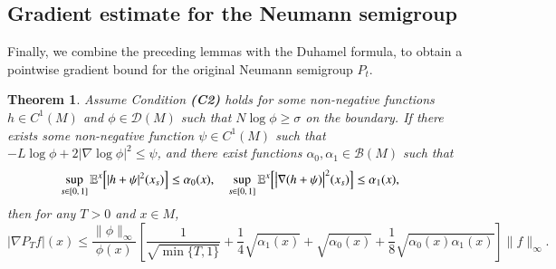 \documentclass[11pt,twoside, reqno]{article}
\def\r{\right}
\def\l{\left}
\newcommand\1{\mathbbm{1}}
\newtheorem{theorem}{Theorem}[section]
\theoremstyle{definition}
\numberwithin{equation}{section}
\begin{document}
\subsection{Gradient estimate for the Neumann semigroup}

Finally, we combine the preceding lemmas with  the Duhamel formula, to obtain a pointwise gradient bound for the original Neumann semigroup \(P_t\).

\begin{theorem} \label{s1.thm.3}
Assume Condition {\bf (C2)} holds for some non-negative functions \( h \in C^1(M)  \) and \( \phi \in \mathcal{D}(M) \)  such that  \( N \log \phi \geq \sigma \) on the boundary.  If there exists some non-negative function  $\psi\in C^1(M)$ such that  $- L \log \phi + 2|\nabla \log \phi|^2\leq \psi$,  and there exist functions $\alpha_0, \alpha_1\in \mathcal{B}(M)$ such that
\[
\begin{aligned}
&\sup_{s\in [0,\, 1]} \mathbb{E}^x\Bigl[| h +\psi |^2(x_s) \Bigr] \leq \alpha_0(x), \quad \sup_{s\in [0,\, 1]} \mathbb{E}^x\Bigl[ \bigl| \nabla (h +\psi)\bigr|^2(x_s) \Bigr] \leq \alpha_1(x),
\end{aligned}
\]
then for any \( T > 0 \) and \( x \in M \),
\[
|\nabla P_T f|(x) \leq 
\frac{\|\phi\|_{\infty}}{\phi(x)} 
\l[\frac{1}{\sqrt{\min\{T,1\}}} + \frac14\sqrt{\alpha_1(x)} + \sqrt{\alpha_0(x)} 
+  \frac{1}{8}\sqrt{ \alpha_0(x) \alpha_1(x) } \r] \|f\|_{\infty}.
\]
\end{theorem}
\end{document}
